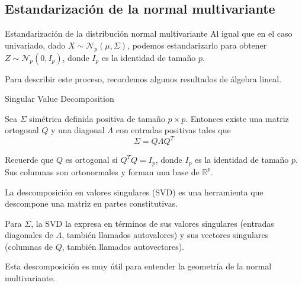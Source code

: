 \documentclass[
  11pt,
  ignorenonframetext,
  aspectratio=169]{beamer}
\theoremstyle{plain}
\theoremstyle{definition}
\theoremstyle{remark}
\begin{document}
\subsection{Estandarización de la normal
multivariante}\label{estandarizaciuxf3n-de-la-normal-multivariante}

\begin{frame}{Estandarización de la distribución normal multivariante}
\label{estandarizaciuxf3n-de-la-distribuciuxf3n-normal-multivariante}
Al igual que en el caso univariado, dado
\(X \sim \mathcal{N}_{p}(\mu, \Sigma)\), podemos estandarizarlo para
obtener \(Z \sim \mathcal{N}_{p}(0, I_p)\), donde \(I_p\) es la
identidad de tamaño \(p\).

\bigpause

Para describir este proceso, recordemos algunos resultados de álgebra
lineal.
\end{frame}

\begin{frame}{Singular Value Decomposition}
\label{singular-value-decomposition}
\begin{theorem}
Sea $\Sigma$ simétrica definida positiva de tamaño $p \times p$. Entonces existe una matriz ortogonal $Q$ y una diagonal $\Lambda$ con entradas positivas tales que 
$$
\Sigma = Q \Lambda Q^{T}
$$
\end{theorem}

\pause

\begin{remark}
Recuerde que $Q$ es ortogonal si $Q^{T}Q = I_p$, donde $I_p$ es la identidad de tamaño $p$. Sus columnas son ortonormales y forman una base de $\mathbb{R}^p$.
\end{remark}
\end{frame}

\begin{frame}{}
\label{section-7}
\begin{remark}
La descomposición en valores singulares (SVD) es una herramienta que descompone una matriz en partes constitutivas.

\bigpause 

Para $\Sigma$, la SVD la expresa en términos de sus \alert{valores singulares} (entradas diagonales de $\Lambda$, también llamados \alert{autovalores}) y sus \alert{vectores singulares} (columnas de $Q$, también llamados \alert{autovectores}).

\bigpause

Esta descomposición es muy útil para entender la geometría de la normal multivariante.
\end{remark}
\end{frame}
\end{document}
